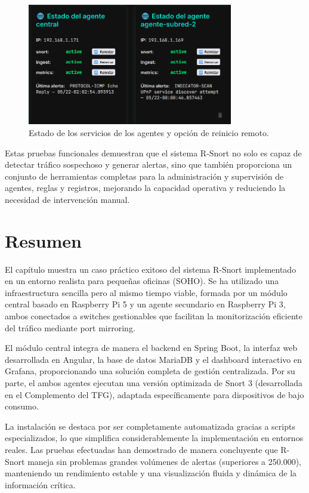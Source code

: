 \documentclass[11pt,a4paper,twoside]{report}
\begin{document}
\begin{figure}[H]
	\centering
	\includegraphics[width=0.8\textwidth]{pruebas/9.png}
	\caption{Estado de los servicios de los agentes y opción de reinicio remoto.}
	\label{fig:estado_servicios_agentes}
\end{figure}

Estas pruebas funcionales demuestran que el sistema R-Snort no solo es capaz de detectar tráfico sospechoso y generar alertas, sino que también proporciona un conjunto de herramientas completas para la administración y supervisión de agentes, reglas y registros, mejorando la capacidad operativa y reduciendo la necesidad de intervención manual.

\section{Resumen}

El capítulo muestra un caso práctico exitoso del sistema R-Snort implementado en un entorno realista para pequeñas oficinas (SOHO). Se ha utilizado una infraestructura sencilla pero al mismo tiempo viable, formada por un módulo central basado en Raspberry Pi 5 y un agente secundario en Raspberry Pi 3, ambos conectados a switches gestionables que facilitan la monitorización eficiente del tráfico mediante port mirroring.\newline

El módulo central integra de manera el backend en Spring Boot, la interfaz web desarrollada en Angular, la base de datos MariaDB y el dashboard interactivo en Grafana, proporcionando una solución completa de gestión centralizada. Por su parte, el ambos agentes ejecutan una versión optimizada de Snort 3 (desarrollada en el Complemento del TFG), adaptada específicamente para dispositivos de bajo consumo.\newline

La instalación se destaca por ser completamente automatizada gracias a scripts especializados, lo que simplifica considerablemente la implementación en entornos reales. Las pruebas efectuadas han demostrado de manera concluyente que R-Snort maneja sin problemas grandes volúmenes de alertas (superiores a 250.000), manteniendo un rendimiento estable y una visualización fluida y dinámica de la información crítica.\newline
\end{document}
